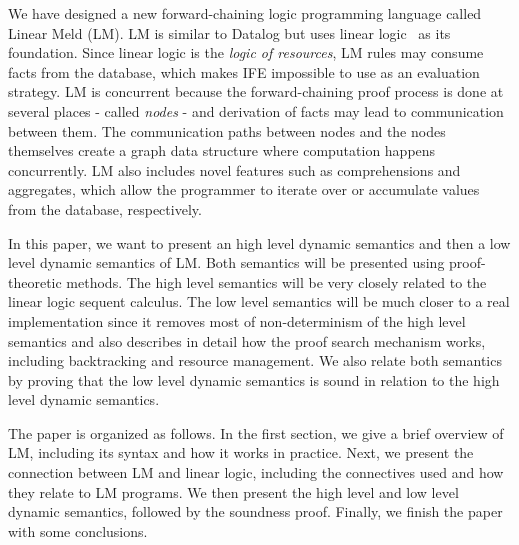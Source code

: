 We have designed a new forward-chaining logic programming language called Linear Meld (LM). LM is similar to Datalog but uses linear logic~\cite{girard-87} as its foundation. Since linear logic is the \emph{logic of resources}, LM rules may consume facts from the database, which makes IFE impossible to use as
an evaluation strategy. LM is concurrent because the forward-chaining proof process is done at several places - called \emph{nodes} - and derivation of facts may lead to communication between them. The communication paths between nodes and the nodes themselves create a graph data structure where computation happens concurrently. LM also includes novel features such as comprehensions and aggregates, which allow the programmer to iterate over
or accumulate values from the database, respectively.

In this paper, we want to present an high level dynamic semantics and then a low level dynamic semantics of LM.
Both semantics will be presented using proof-theoretic methods. The high level semantics will be very closely related to the linear logic sequent calculus.
The low level semantics will be much closer to a real implementation since it removes most of non-determinism of the high level semantics and
also describes in detail how the proof search mechanism works, including backtracking and resource management. We also relate both semantics by
proving that the low level dynamic semantics is sound in relation to the high level dynamic semantics.

The paper is organized as follows. In the first section, we give a brief overview of LM, including its syntax and how it works in practice.
Next, we present the connection between LM and linear logic, including the connectives used and how they relate to LM programs. We then present
the high level and low level dynamic semantics, followed by the soundness proof. Finally, we finish the paper with some conclusions.